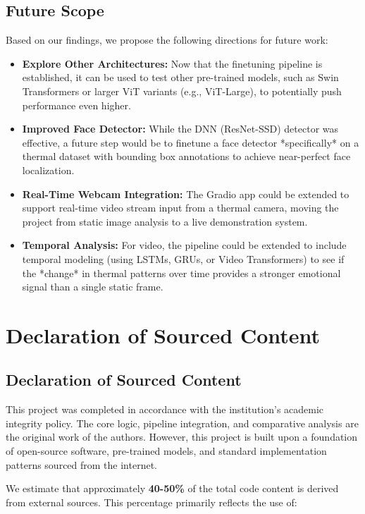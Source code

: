 \documentclass[12pt,a4paper]{report}
\begin{document}
\section{Future Scope}
Based on our findings, we propose the following directions for future work:
\begin{itemize}
    \item \textbf{Explore Other Architectures:} Now that the finetuning pipeline is established, it can be used to test other pre-trained models, such as Swin Transformers or larger ViT variants (e.g., ViT-Large), to potentially push performance even higher.
    \item \textbf{Improved Face Detector:} While the DNN (ResNet-SSD) detector was effective, a future step would be to finetune a face detector *specifically* on a thermal dataset with bounding box annotations to achieve near-perfect face localization.
    \item \textbf{Real-Time Webcam Integration:} The Gradio app could be extended to support real-time video stream input from a thermal camera, moving the project from static image analysis to a live demonstration system.
    \item \textbf{Temporal Analysis:} For video, the pipeline could be extended to include temporal modeling (using LSTMs, GRUs, or Video Transformers) to see if the *change* in thermal patterns over time provides a stronger emotional signal than a single static frame.
\end{itemize}

\chapter{Declaration of Sourced Content}
\label{sec:declaration}
\section{Declaration of Sourced Content}

This project was completed in accordance with the institution's academic integrity policy. The core logic, pipeline integration, and comparative analysis are the original work of the authors. However, this project is built upon a foundation of open-source software, pre-trained models, and standard implementation patterns sourced from the internet.

We estimate that approximately \textbf{40-50\%} of the total code content is derived from external sources. This percentage primarily reflects the use of:
\end{document}
